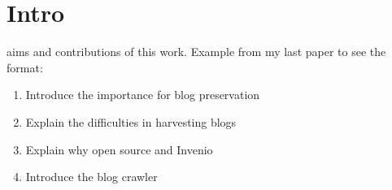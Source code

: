 \section{Intro}

aims and contributions of this work. Example from my last paper to see the format:

\begin{enumerate}
  \item Introduce the importance for blog preservation
  \item Explain the difficulties in harvesting blogs
  \item Explain why open source and Invenio
  \item Introduce the blog crawler
\end{enumerate}
